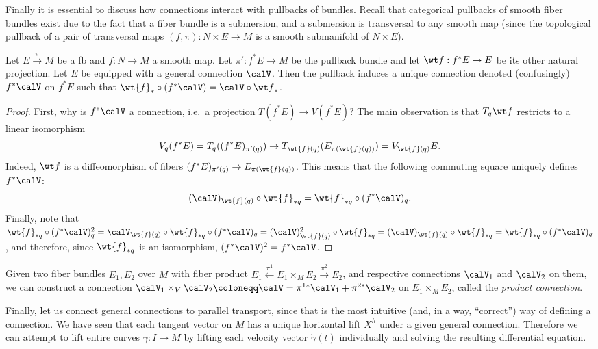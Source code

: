 Finally it is essential to discuss how connections interact with pullbacks of bundles. Recall that categorical pullbacks of smooth fiber bundles exist due to the fact that a fiber bundle is a submersion, and a submersion is transversal to any smooth map (since the topological pullback of a pair of transversal maps $(f,\pi):N\times E\to M$ is a smooth submanifold of $N\times E$).

\begin{prop}
   Let $E\overset{\pi}{\to}M$ be a \gls{fb} and $f:N\to M$ a smooth map. Let $\pi':f^\ast E\to M$ be the pullback bundle and let $\wt f:f^\ast E\to E$ be its other natural projection. Let $E$ be equipped with a general connection $\calV$. Then the pullback induces a unique connection denoted (confusingly) $f^\ast\calV$ on $f^\ast E$ such that $\wt{f}_\ast\circ (f^\ast \calV)=\calV\circ {\wt f}_\ast$.
\end{prop}
\begin{proof}
    First, why is $f^\ast\calV$ a connection, i.e.\ a projection $T(f^\ast E)\to V(f^\ast E)$? The main observation is that $T_q{\wt f}$ restricts to a linear isomorphism 
    \[V_q (f^\ast E)=T_q((f^\ast E)_{\pi'(q)})\to T_{\wt{f}(q)}(E_{\pi(\wt{f}(q))})=V_{\wt{f}(q)}E.\]
    Indeed, $\wt f$ is a diffeomorphism of fibers $(f^\ast E)_{\pi'(q)}\to E_{\pi(\wt{f}(q))}$. This means that the following commuting square uniquely defines $f^\ast\calV$:
    \[(\calV)_{\wt{f}(q)}\circ \wt{f}_{\ast q}=\wt{f}_{\ast q}\circ (f^\ast \calV)_q.\]
    Finally, note that $\wt{f}_{\ast q}\circ (f^\ast\calV)^2_q=\calV_{\wt{f}(q)}\circ \wt{f}_{\ast q}\circ (f^\ast\calV)_q=(\calV)^2_{\wt{f}(q)}\circ \wt{f}_{\ast q}=(\calV)_{\wt{f}(q)}\circ \wt{f}_{\ast q}=\wt{f}_{\ast q}\circ (f^\ast \calV)_q$, and therefore, since $\wt{f}_{\ast q}$ is an isomorphism, $(f^\ast\calV)^2=f^\ast\calV$.
\end{proof}

\begin{rem}
    Given two fiber bundles $E_1,E_2$ over $M$ with fiber product $E_1\overset{\pi^1}{\leftarrow}E_1\times_M E_2\overset{\pi^2}{\to}E_2$, and respective connections $\calV_1$ and $\calV_2$ on them, we can construct a connection $\calV_1\times_V\calV_2\coloneqq \calV=\pi^{1\ast}\calV_1+\pi^{2\ast}\calV_2$ on $E_1\times_M E_2$, called the \emph{product connection}.
\end{rem}


Finally, let us connect general connections to parallel transport, since that is the most intuitive (and, in a way, ``correct'') way of defining a connection. We have seen that each tangent vector on $M$ has a unique horizontal lift $X^h$ under a given general connection. Therefore we can attempt to lift entire curves $\gamma:I\to M$ by lifting each velocity vector $\dot\gamma(t)$ individually and solving the resulting differential equation.


